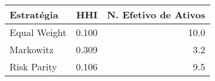 \begin{tabular}{lrr}
\toprule
Estratégia & HHI & N. Efetivo de Ativos \\
\midrule
Equal Weight & 0.100 & 10.0 \\
Markowitz & 0.309 & 3.2 \\
Risk Parity & 0.106 & 9.5 \\
\bottomrule
\end{tabular}
